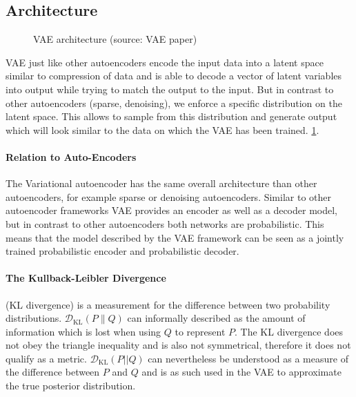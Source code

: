 


\subsection{Architecture}
\label{sub:vae_architecture}

\begin{figure}[htb]
\centering
\resizebox{5cm}{!}{}
  \caption{VAE architecture (source: VAE paper)}\label{fig:vae_architecture}
\end{figure}
VAE just like other autoencoders encode the input data into a latent space similar to compression of data and is able to decode a vector of latent variables into output while trying to match the output to the input.
But in contrast to other autoencoders (sparse, denoising), we enforce a specific distribution on the latent space.
This allows to sample from this distribution and generate output which will look similar to the data on which the VAE has been trained.
\ref{fig:vae_architecture}.

\paragraph{Relation to Auto-Encoders}
The Variational autoencoder has the same overall architecture than other autoencoders, for example sparse or denoising autoencoders.
Similar to other autoencoder frameworks VAE provides an encoder as well as a decoder model, but in contrast to other autoencoders both networks are probabilistic. This means that the model described by the VAE framework can be seen as a jointly trained probabilistic encoder and probabilistic decoder.



\paragraph{The Kullback-Leibler Divergence} (KL divergence) is a measurement for the difference between two probability distributions. $\mathcal{D}_{\mathrm{KL}}(P \| Q)$ can informally described as the amount of information which is lost when using $Q$ to represent $P$.
The KL divergence does not obey the triangle inequality and is also not symmetrical, therefore it does not qualify as a metric.
$\mathcal{D}_{\mathrm{KL}}(P||Q)$ can nevertheless be understood as a measure of the difference between $P$ and $Q$ and is as such used in the VAE to approximate the true posterior distribution.

